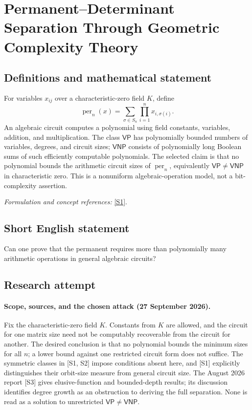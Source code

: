 \documentclass[11pt]{article}
\begin{document}
\section*{\texorpdfstring{Permanent–Determinant Separation Through Geometric Complexity Theory}{Permanent–Determinant Separation Through Geometric Complexity Theory}}\label{statement}
\subsection{Definitions and mathematical statement}
For variables $x_{ij}$ over a characteristic-zero field $K$, define
\[
 \operatorname{per}_n(x)=\sum_{\sigma\in S_n}\prod_{i=1}^n x_{i,\sigma(i)}.
\]
An algebraic circuit computes a polynomial using field constants, variables, addition, and multiplication. The class $\mathsf{VP}$ has polynomially bounded numbers of variables, degrees, and circuit sizes; $\mathsf{VNP}$ consists of polynomially long Boolean sums of such efficiently computable polynomials. The selected claim is that no polynomial bounds the arithmetic circuit sizes of $\operatorname{per}_n$, equivalently $\mathsf{VP}\ne\mathsf{VNP}$ in characteristic zero. This is a nonuniform algebraic-operation model, not a bit-complexity assertion.
\par\smallskip\textit{Formulation and concept references:} \href{https://www.prateekdwivedi.in/papers/symACT-confversion.pdf}{[S1]}.

\subsection{Short English statement}
Can one prove that the permanent requires more than polynomially many arithmetic operations in general algebraic circuits?
\subsection{Research attempt}

\paragraph{Scope, sources, and the chosen attack (27 September 2026).}
Fix the characteristic-zero field $K$. Constants from $K$ are allowed,
and the circuit for one matrix size need not be computably recoverable
from the circuit for another. The desired conclusion is that no
polynomial bounds the minimum sizes for all $n$; a lower bound against
one restricted circuit form does not suffice.
The symmetric classes in [S1, S2] impose conditions absent here, and
[S1] explicitly distinguishes their orbit-size measure from general
circuit size. The August 2026 report [S3] gives elusive-function and
bounded-depth results; its discussion identifies degree growth as an
obstruction to deriving the full separation. None is read as a solution
to unrestricted $\mathsf{VP}\ne\mathsf{VNP}$.
\end{document}
